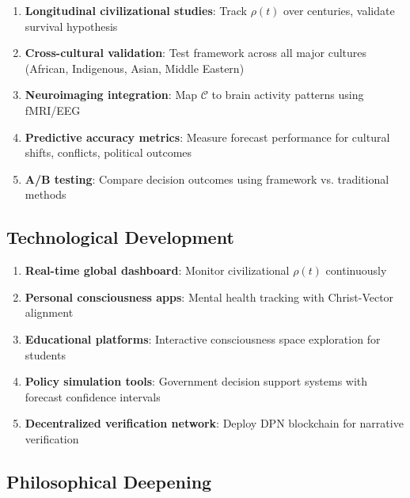 \documentclass[11pt,a4paper]{article}
\theoremstyle{definition}
\theoremstyle{remark}
\newcommand{\CC}{\mathcal{C}}
\begin{document}
\begin{enumerate}
\item \textbf{Longitudinal civilizational studies}: Track \(\rho(t)\) over centuries, validate survival hypothesis

\item \textbf{Cross-cultural validation}: Test framework across all major cultures (African, Indigenous, Asian, Middle Eastern)

\item \textbf{Neuroimaging integration}: Map \(\CC\) to brain activity patterns using fMRI/EEG

\item \textbf{Predictive accuracy metrics}: Measure forecast performance for cultural shifts, conflicts, political outcomes

\item \textbf{A/B testing}: Compare decision outcomes using framework vs. traditional methods
\end{enumerate}

\subsection{Technological Development}

\begin{enumerate}
\item \textbf{Real-time global dashboard}: Monitor civilizational \(\rho(t)\) continuously

\item \textbf{Personal consciousness apps}: Mental health tracking with Christ-Vector alignment

\item \textbf{Educational platforms}: Interactive consciousness space exploration for students

\item \textbf{Policy simulation tools}: Government decision support systems with forecast confidence intervals

\item \textbf{Decentralized verification network}: Deploy DPN blockchain for narrative verification
\end{enumerate}

\subsection{Philosophical Deepening}
\end{document}
